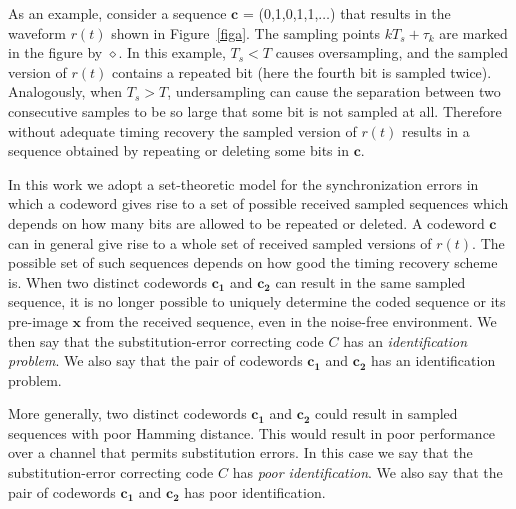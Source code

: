 As an example, consider a sequence $\mathbf{c}$ =
(0,1,0,1,1,$\ldots$) that results in the waveform $r(t)$ shown in
Figure~\ref{figa}. The sampling points $kT_s+\tau_k$ are marked in
the figure by $\diamond$. In this example, $T_s<T$ causes
oversampling, and the sampled version of $r(t)$ contains a
repeated bit (here the fourth bit is sampled twice).
%
Analogously, when $T_s>T$, undersampling can cause the separation
between two consecutive samples to be so large that some bit is
not sampled at all. Therefore without adequate timing recovery the
sampled version of $r(t)$ results in a sequence obtained by
repeating or deleting some bits in $\mathbf{c}$.


In this work we adopt a set-theoretic model for the synchronization
errors in which a codeword gives rise to a set of possible received
sampled sequences which depends on how many bits are allowed to be
repeated or deleted. A codeword $\mathbf{c}$ can in general give
rise to a whole set of received sampled versions of $r(t)$. The
possible set of such sequences depends on how good the timing
recovery scheme is. When two distinct codewords $\mathbf{c_1}$ and
$\mathbf{c_2}$ can result in the same sampled sequence, it is no
longer possible to uniquely determine the coded sequence or its
pre-image $\mathbf{x}$ from the received sequence, even in the
noise-free environment. We then say that the substitution-error
correcting code $C$ has an \textit{identification problem}. We also
say that the pair of codewords $\mathbf{c_1}$ and $\mathbf{c_2}$ has
an identification problem.

More generally, two distinct codewords $\mathbf{c_1}$ and
$\mathbf{c_2}$ could result in sampled sequences with poor Hamming
distance. This would result in poor performance over a channel
that permits substitution errors. In this case we say that the
substitution-error correcting code $C$ has {\em poor
identification}. We also say that the pair of codewords
$\mathbf{c_1}$ and $\mathbf{c_2}$ has poor identification.




